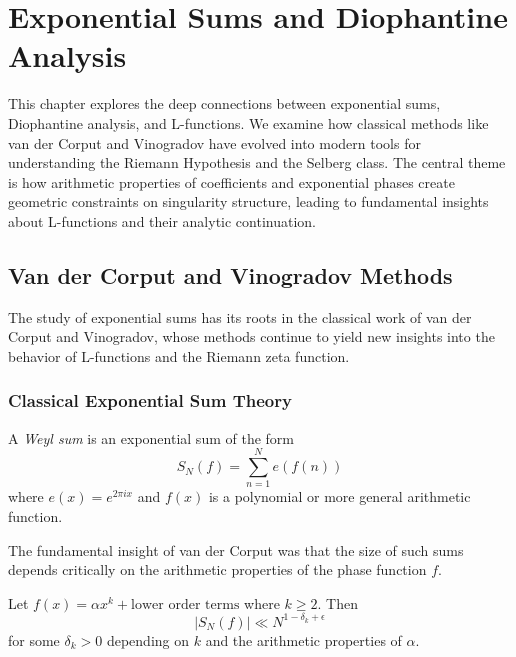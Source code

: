 \chapter{Exponential Sums and Diophantine Analysis}
\label{ch:exponential_sums}

\begin{chapterabstract}
This chapter explores the deep connections between exponential sums, Diophantine analysis, and L-functions. We examine how classical methods like van der Corput and Vinogradov have evolved into modern tools for understanding the Riemann Hypothesis and the Selberg class. The central theme is how arithmetic properties of coefficients and exponential phases create geometric constraints on singularity structure, leading to fundamental insights about L-functions and their analytic continuation.
\end{chapterabstract}

\section{Van der Corput and Vinogradov Methods}
\label{sec:classical_methods}

The study of exponential sums has its roots in the classical work of van der Corput and Vinogradov, whose methods continue to yield new insights into the behavior of L-functions and the Riemann zeta function.

\subsection{Classical Exponential Sum Theory}

\begin{definition}
A \emph{Weyl sum} is an exponential sum of the form
\begin{equation}
S_N(f) = \sum_{n=1}^N e(f(n))
\end{equation}
where $e(x) = e^{2\pi i x}$ and $f(x)$ is a polynomial or more general arithmetic function.
\end{definition}

The fundamental insight of van der Corput was that the size of such sums depends critically on the arithmetic properties of the phase function $f$.

\begin{theorem}
Let $f(x) = \alpha x^k + \text{lower order terms}$ where $k \geq 2$. Then
\begin{equation}
|S_N(f)| \ll N^{1-\delta_k + \epsilon}
\end{equation}
for some $\delta_k > 0$ depending on $k$ and the arithmetic properties of $\alpha$.
\end{theorem}

